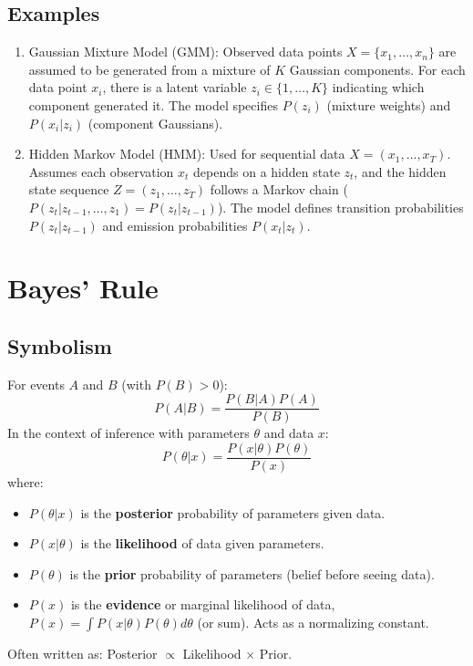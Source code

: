 \documentclass{article}
\begin{document}
\subsection*{Examples}
\begin{enumerate}
    \item Gaussian Mixture Model (GMM): Observed data points $X = \{x_1, \dots, x_n\}$ are assumed to be generated from a mixture of $K$ Gaussian components. For each data point $x_i$, there is a latent variable $z_i \in \{1, \dots, K\}$ indicating which component generated it. The model specifies $P(z_i)$ (mixture weights) and $P(x_i | z_i)$ (component Gaussians).
    \item Hidden Markov Model (HMM): Used for sequential data $X = (x_1, \dots, x_T)$. Assumes each observation $x_t$ depends on a hidden state $z_t$, and the hidden state sequence $Z=(z_1, \dots, z_T)$ follows a Markov chain ($P(z_t | z_{t-1}, \dots, z_1) = P(z_t | z_{t-1})$). The model defines transition probabilities $P(z_t|z_{t-1})$ and emission probabilities $P(x_t|z_t)$.
\end{enumerate}

\section{Bayes' Rule}

\subsection*{Symbolism}
For events $A$ and $B$ (with $P(B)>0$):
\[ P(A|B) = \frac{P(B|A) P(A)}{P(B)} \]
In the context of inference with parameters $\theta$ and data $x$:
\[ P(\theta|x) = \frac{P(x|\theta) P(\theta)}{P(x)} \]
where:
\begin{itemize}
    \item $P(\theta|x)$ is the \textbf{posterior} probability of parameters given data.
    \item $P(x|\theta)$ is the \textbf{likelihood} of data given parameters.
    \item $P(\theta)$ is the \textbf{prior} probability of parameters (belief before seeing data).
    \item $P(x)$ is the \textbf{evidence} or marginal likelihood of data, $P(x) = \int P(x|\theta) P(\theta) d\theta$ (or sum). Acts as a normalizing constant.
\end{itemize}
Often written as: Posterior $\propto$ Likelihood $\times$ Prior.
\end{document}
